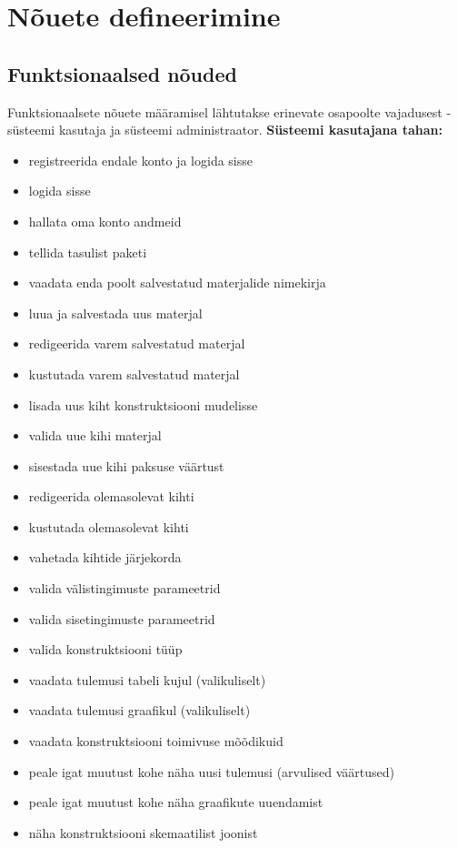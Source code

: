 \section{Nõuete defineerimine}
\subsection{Funktsionaalsed nõuded}
\label{subsec_func_req}
Funktsionaalsete nõuete määramisel lähtutakse erinevate osapoolte vajadusest - süsteemi kasutaja ja süsteemi 
administraator.
\textbf{Süsteemi kasutajana tahan:}
\begin{itemize}
    \item registreerida endale konto ja logida sisse
    \item logida sisse
    \item hallata oma konto andmeid
    \item tellida tasulist paketi
    \item vaadata enda poolt salvestatud materjalide nimekirja
    \item luua ja salvestada uus materjal
    \item redigeerida varem salvestatud materjal
    \item kustutada varem salvestatud materjal
    \item lisada uus kiht konstruktsiooni mudelisse
    \item valida uue kihi materjal
    \item sisestada uue kihi paksuse väärtust
    \item redigeerida olemasolevat kihti
    \item kustutada olemasolevat kihti
    \item vahetada kihtide järjekorda
    \item valida välistingimuste parameetrid
    \item valida sisetingimuste parameetrid
    \item valida konstruktsiooni tüüp
    \item vaadata tulemusi tabeli kujul (valikuliselt)
    \item vaadata tulemusi graafikul (valikuliselt)
    \item vaadata konstruktsiooni toimivuse mõõdikuid
    \item peale igat muutust kohe näha uusi tulemusi (arvulised väärtused)
    \item peale igat muutust kohe näha graafikute uuendamist
    \item näha konstruktsiooni skemaatilist joonist

\end{itemize}
